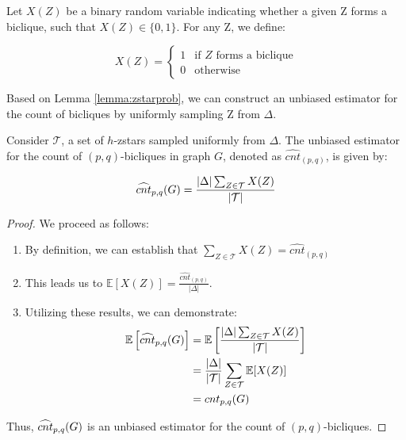Let $X(Z)$ be a binary random variable indicating whether a given \zstar Z forms a biclique, such that $X(Z) \in \{0,1\}$. For any Z, we define:

\[
X(Z) = \begin{cases}
	1 & \text{if } Z \text{ forms a biclique} \\
	0 & \text{otherwise}
\end{cases}
\]

Based on Lemma \ref{lemma:zstarprob}, we can construct an unbiased estimator for the count of bicliques by uniformly sampling Z from $\Delta$.


\begin{theorem}
 Consider $\mathcal{T}$, a set of $h$-zstars sampled uniformly from $\Delta$. The unbiased estimator for the count of $(p,q)$-bicliques in graph $G$, denoted as $\widehat{cnt}_{(p,q)}$, is given by:

	\[
	{\widehat{cnt}_{p,q}(G) } = \frac{|\Delta| \sum_{Z \in \mathcal{T}} X(Z)}{|\mathcal{T}|}
	\]

	\begin{proof}[Proof]
		We proceed as follows:
		\begin{enumerate}
			\item By definition, we can establish that $\sum_{Z \in \mathcal{T}} X(Z) = \widehat{cnt}_{(p,q)}$
			\item This leads us to $\mathbb{E}[X(Z)] = \frac{\widehat{cnt}_{(p,q)}}{|\Delta|}$.
			\item Utilizing these results, we can demonstrate:
			\[
			\begin{aligned}
				\mathbb{E}\left[{\widehat{cnt}_{p,q}(G) }\right] &= \mathbb{E}\left[\frac{|\Delta| \sum_{Z \in \mathcal{T}} X(Z)}{|\mathcal{T}|}\right] \\
				&= \frac{|\Delta|}{|\mathcal{T}|} \sum_{Z \in \mathcal{T}} \mathbb{E}[X(Z)] \\
				&= {cnt_{p,q}(G) }
			\end{aligned}
			\]
		\end{enumerate}
		Thus,  ${\widehat{cnt}_{p,q}(G) }$ is an unbiased estimator for the count of $(p,q)$-bicliques.
	\end{proof}
\end{theorem}

